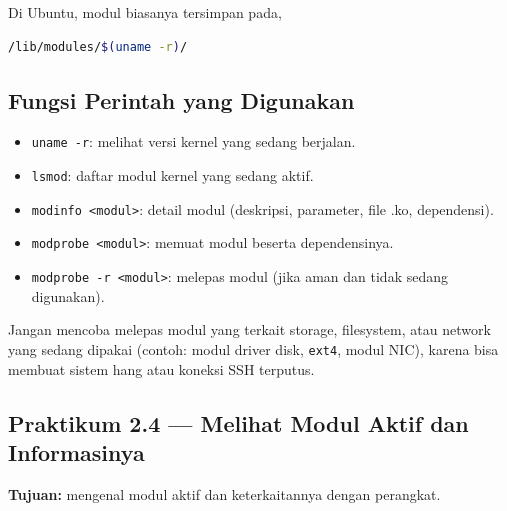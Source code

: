 Di Ubuntu, modul biasanya tersimpan pada,
\begin{lstlisting}[language=bash, caption={Lokasi modul kernel}]
/lib/modules/$(uname -r)/
\end{lstlisting}

\subsection*{Fungsi Perintah yang Digunakan}
\begin{itemize}
    \item \texttt{uname -r}: melihat versi kernel yang sedang berjalan.
    \item \texttt{lsmod}: daftar modul kernel yang sedang aktif.
    \item \texttt{modinfo <modul>}: detail modul (deskripsi, parameter, file .ko, dependensi).
    \item \texttt{modprobe <modul>}: memuat modul beserta dependensinya.
    \item \texttt{modprobe -r <modul>}: melepas modul (jika aman dan tidak sedang digunakan).
\end{itemize}

\begin{warningbox}
Jangan mencoba melepas modul yang terkait storage, filesystem, atau network yang sedang dipakai (contoh: modul driver disk, \texttt{ext4}, modul NIC),
karena bisa membuat sistem hang atau koneksi SSH terputus.
\end{warningbox}

\subsection*{Praktikum 2.4 --- Melihat Modul Aktif dan Informasinya}
\textbf{Tujuan:} mengenal modul aktif dan keterkaitannya dengan perangkat.

